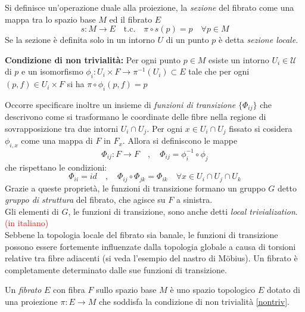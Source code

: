 Si definisce un'operazione duale alla proiezione, la \emph{sezione} del fibrato
come una mappa tra lo spazio base $M$ ed il fibrato $E$
$$
s : M \to E \quad \mathrm{t.c.}\quad \pi \circ s (p) = p \quad \forall p \in M
$$
Se la sezione è definita solo in un intorno $U$ di un punto $p$ è detta \emph{sezione locale.}


\begin{axiom}\textbf{Condizione di non trivialità:} \label{nontriv}
      Per ogni punto $p \in M$ esiste un intorno $U_i \in \mathcal{U}$ di $p$ e un isomorfismo
      $\phi_i : U_i \times F \to \pi^{-1}(U_i) \subset E$ tale che per ogni
      $(p,f) \in U_i \times F$ si ha $\pi \circ \phi_i(p,f) = p$
\end{axiom}

Occorre specificare inoltre un insieme di \emph{funzioni di transizione} $\{\Phi_{ij}\}$ che
descrivono come si trasformano le coordinate delle fibre nella regione di
sovrapposizione tra due intorni $U_i \cap U_j$. Per ogni $x \in U_i \cap U_j$ fissato si
cosidera $\phi_{i,x}$ come una mappa di $F$ in $F_x$.
Allora si definiscono le mappe
\begin{equation}\label{eq:transfunctions}
   \Phi_{ij} : F \to F \quad , \quad \Phi_{ij} = \phi_i^{-1} \circ\phi_j
\end{equation}
che rispettano le condizioni:
\begin{equation}
   \Phi_{ii} = id \quad , \quad \Phi_{ij} \circ \Phi_{jk} = \Phi_{ik}
   \quad \forall x \in U_i \cap U_j \cap U_k
\end{equation}
Grazie a queste proprietà, le funzioni di transizione formano un gruppo $G$ detto
\emph{gruppo di struttura} del fibrato, che agisce su $F$ a sinistra.\\
Gli elementi di $G$, le funzioni di transizione, sono anche detti
\emph{local trivialization}. \textcolor{red}{(in italiano)}\\

Sebbene la topologia locale del fibrato sia banale, le funzioni di transizione
possono essere fortemente influenzate dalla topologia globale a causa di torsioni
relative tra fibre adiacenti (si veda l'esempio del nastro di Möbius). Un fibrato
è completamente determinato dalle sue funzioni di transizione.\\

\begin{definition}
   Un \emph{fibrato} $E$ con fibra $F$ sullo spazio base $M$ è uno spazio topologico
   $E$ dotato di una proiezione $\pi : E \to M$ che soddisfa la condizione di
   non trivialità \ref{nontriv}.
\end{definition}

